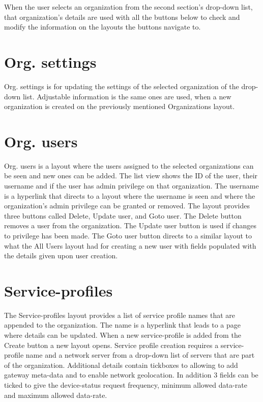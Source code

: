 When the user selects an organization from the second section's drop-down list, that organization's details are used with all the buttons below to check and modify the information on the layouts the buttons navigate to.

\section{Org. settings}
Org. settings is for updating the settings of the selected organization of the drop-down list.
Adjustable information is the same ones are used, when a new organization is created on the previously mentioned Organizations layout.

\section{Org. users}
Org. users is a layout where the users assigned to the selected organizations can be seen and new ones can be added.
The list view shows the ID of the user, their username and if the user has admin privilege on that organization.
The username is a hyperlink that directs to a layout where the username is seen and where the organization's admin privilege can be granted or removed.
The layout provides three buttons called Delete, Update user, and Goto user.
The Delete button removes a user from the organization.
The Update user button is used if changes to privilege has been made.
The Goto user button directs to a similar layout to what the All Users layout had for creating a new user with fields populated with the details given upon user creation.
\clearpage

\section{Service-profiles}
The Service-profiles layout provides a list of service profile names that are appended to the organization.
The name is a hyperlink that leads to a page where details can be updated.
When a new service-profile is added from the Create button a new layout opens.
Service profile creation requires a service-profile name and a network server from a drop-down list of servers that are part of the organization.
Additional details contain tickboxes to allowing to add gateway meta-data and to enable network geolocation.
In addition 3 fields can be ticked to give the device-status request frequency, minimum allowed data-rate and maximum allowed data-rate.


